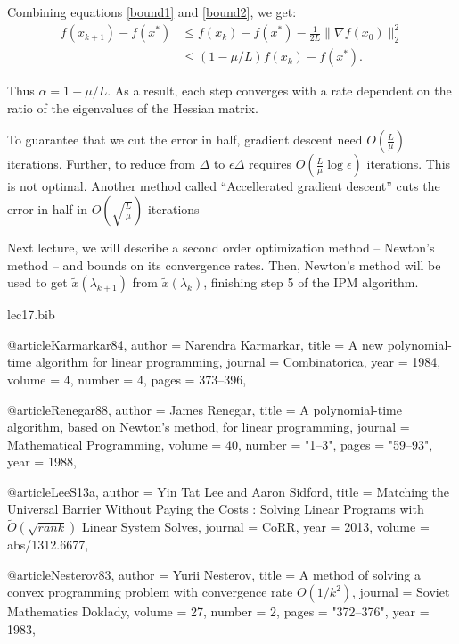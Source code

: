 \documentclass[11pt]{article}
\begin{document}
Combining equations \ref{bound1} and \ref{bound2}, we get:
\begin{align}
f(x_{k+1}) - f(x^*) &\leq f(x_k) - f(x^*) - \frac{1}{2L}\|\nabla f(x_0)\|^2_2 \\
& \leq (1 - \mu/L) f(x_k) - f(x^*). 
\end{align}

Thus $\alpha  = 1 - \mu / L$. As a result, each step converges with a rate dependent on the ratio of the eigenvalues of the Hessian matrix.

To guarantee that we cut the error in half, gradient descent need $O(\frac{L}{\mu})$ iterations. Further, to reduce from $\Delta$ to $\epsilon \Delta$ requires $O(\frac{L}{\mu}\log{\epsilon})$ iterations. This is not optimal. Another method called ``Accellerated gradient descent'' cuts the error in half in $O(\sqrt{\frac{L}{\mu}})$ iterations \cite{Nesterov83}

Next lecture, we will describe a second order optimization method -- Newton's method -- and bounds on its convergence rates. Then, Newton's method will be used to get $\tilde{x}(\lambda_{k+1})$ from $\tilde{x}(\lambda_k)$, finishing step 5 of the IPM algorithm.

\begin{filecontents}{lec17.bib}

@article{Karmarkar84,
  author    = {Narendra Karmarkar},
  title     = {A new polynomial-time algorithm for linear programming},
  journal   = {Combinatorica},
  year      = {1984},
  volume    = {4},
  number    = {4},
  pages     = {373--396},
}

@article{Renegar88,
  author = {James Renegar},
  title = {A polynomial-time algorithm, based on {Newton's} method, for linear programming},
  journal = {Mathematical Programming},
  volume = 40,
  number = "1--3",
  pages = "59--93",
  year = 1988,
}

@article{LeeS13a,
  author    = {Yin Tat Lee and
               Aaron Sidford},
  title     = {Matching the Universal Barrier Without Paying the Costs : Solving
               Linear Programs with $\tilde{{O}}(\sqrt{rank})$ Linear System Solves},
  journal   = {CoRR},
  year      = {2013},
  volume    = {abs/1312.6677},
}

@article{Nesterov83,
  author = {Yurii Nesterov},
  title = {A method of solving a convex programming problem with convergence rate ${O}(1/k^2)$},
  journal = {Soviet Mathematics Doklady},
  volume = 27,
  number = 2,
  pages = "372--376",
  year = 1983,
}

\end{filecontents}


\end{document}
